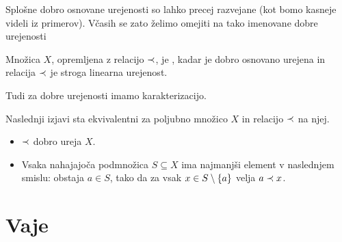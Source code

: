 \begin{dokaz}
\end{dokaz}

Splošne dobro osnovane urejenosti so lahko precej razvejane (kot bomo kasneje videli iz primerov). Včasih se zato želimo omejiti na tako imenovane dobre urejenosti

\begin{definicija}
        Množica $X$, opremljena z relacijo $\prec$, je , kadar je dobro osnovano urejena in relacija $\prec$ je stroga linearna urejenost.
\end{definicija}

Tudi za dobre urejenosti imamo karakterizacijo.

\begin{izrek}
        Naslednji izjavi sta ekvivalentni za poljubno množico $X$ in relacijo $\prec$ na njej.
        \begin{itemize}
                \item
                        $\prec$ dobro ureja $X$.
                \item
                        Vsaka nahajajoča podmnožica $S \subseteq X$ ima najmanjši element v naslednjem smislu: obstaja $a \in S$, tako da za vsak $x \in S \setminus \set{a}$ velja $a \prec x$.
        \end{itemize}
\end{izrek}

\begin{dokaz}
\end{dokaz}



\section{Vaje}


